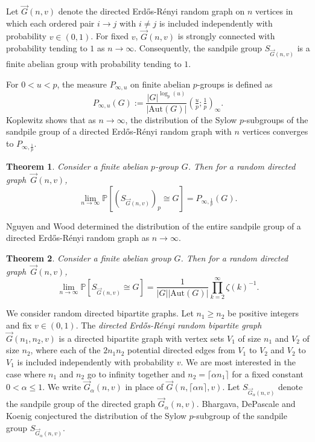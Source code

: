 \documentclass[12pt]{amsart}
\newtheorem{theorem}{Theorem}[section]
\theoremstyle{definition}
\newcommand{\PPP}{\mathbb{P}}
\newcommand{\PPb}[1]{\PPP\left[#1\right]}
\newcommand{\qpochn}[3]{\left(#1;#2\right)_{#3}}
\newcommand{\abs}[1]{\vert#1\vert}
\newcommand{\Aut}{\text{Aut}}
\newcommand{\ceil}[1]{\lceil#1\rceil}
\begin{document}
Let $\vec G(n,v)$ denote the directed Erd\H{o}s-R\'enyi random graph on $n$ vertices in which each ordered pair $i\to j$ with $i\neq j$ is included independently with probability $v\in(0,1)$. For fixed $v$, $\vec G(n,v)$ is strongly connected with probability tending to $1$ as $n\to\infty$. Consequently, the sandpile group $S_{\vec G(n,v)}$ is a finite abelian group with probability tending to $1$.


For $0<u<p$, the measure $P_{\infty,u}$ on finite abelian $p$-groups is defined as
\[
P_{\infty,u}(G)
:=\frac{\abs{G}^{\log_p(u)}}{\abs{\Aut(G)}}
\qpochn{\tfrac{u}{p}}{\tfrac{1}{p}}{\infty}.
\]
Koplewitz \cite[Theorem 1]{koplewitz2017sandpile} shows that as $n \rightarrow \infty$, the distribution of the Sylow $p$-subgroups of the sandpile group of a directed Erd\H{o}s-R\'enyi random graph with $n$ vertices converges to $P_{\infty,\frac{1}{p}}$. 
\begin{theorem}\cite[Theorem 1]{koplewitz2017sandpile}
Consider a finite abelian $p$-group $G$. Then for a random directed graph~$\vec G(n,v)$,
\[
\lim_{n \rightarrow \infty} \PPb{(S_{\vec G(n,v)})_p \cong G} 
=P_{\infty,\frac{1}{p}}(G).
\]
\end{theorem}

Nguyen and Wood \cite[Theorem~1.6]{nguyen2022random} determined the distribution of the entire sandpile group of a directed Erd\H{o}s-R\'enyi random graph as $n\to\infty$.
\begin{theorem}\cite[Theorem~1.6]{nguyen2022random}
Consider a finite abelian group $G$. Then for a random directed graph~$\vec G(n,v)$,
\[
\lim_{n\to\infty} 
\PPb{S_{\vec G(n,v)}\cong G}
=
\frac{1}{\abs{G} \abs{\Aut(G)}}
\prod_{k=2}^{\infty}\zeta(k)^{-1}.
\]
\end{theorem}




We consider random directed bipartite graphs.  Let $n_1 \ge n_2$ be positive integers and fix $v\in (0,1)$. The \emph{directed Erd\H{o}s-R\'enyi random bipartite graph} $\vec G(n_1, n_2, v)$ is a directed bipartite graph with vertex sets $V_1$ of size $n_1$ and $V_2$ of size $n_2$, where each of the $2n_1 n_2$ potential directed edges from $V_1$ to $V_2$ and $V_2$ to $V_1$ is included independently with probability $v$. 
We are most interested in the case where $n_1$ and $n_2$ go to
infinity together and $n_2=\ceil{\alpha n_1}$ for a fixed constant $0<\alpha\leq 1$.
We write $\vec G_{\alpha}(n, v)$ in place of $\vec G(n, \ceil{\alpha n}, v)$. Let $S_{\vec G_{\alpha}(n,v)}$ denote the sandpile group of the directed graph $\vec G_{\alpha}(n,  v)$.
Bhargava, DePascale and Koenig \cite{bhargava2023rank} conjectured the distribution of the Sylow $p$-subgroup of the sandpile group $S_{\vec G_{\alpha}(n,v)}$.
\end{document}
